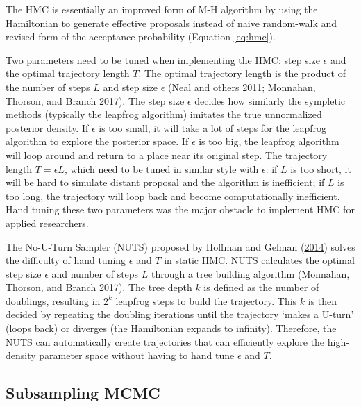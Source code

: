 \documentclass[12pt]{book}
\numberwithin{equation}{chapter}
\begin{document}
The HMC is essentially an improved form of M-H algorithm by using the Hamiltonian to generate effective proposals instead of naive random-walk and revised form of the acceptance probability (Equation \eqref{eq:hmc}).

Two parameters need to be tuned when implementing the HMC: step size \(\epsilon\) and the optimal trajectory length \(T\). The optimal trajectory length is the product of the number of steps \(L\) and step size \(\epsilon\) (Neal and others \protect\hyperlink{ref-neal2011mcmc}{2011}; Monnahan, Thorson, and Branch \protect\hyperlink{ref-monnahan2017faster}{2017}). The step size \(\epsilon\) decides how similarly the sympletic methods (typically the leapfrog algorithm) imitates the true unnormalized posterior density. If \(\epsilon\) is too small, it will take a lot of steps for the leapfrog algorithm to explore the posterior space. If \(\epsilon\) is too big, the leapfrog algorithm will loop around and return to a place near its original step. The trajectory length \(T = \epsilon L\), which need to be tuned in similar style with \(\epsilon\): if \(L\) is too short, it will be hard to simulate distant proposal and the algorithm is inefficient; if \(L\) is too long, the trajectory will loop back and become computationally inefficient. Hand tuning these two parameters was the major obstacle to implement HMC for applied researchers.

The No-U-Turn Sampler (NUTS) proposed by Hoffman and Gelman (\protect\hyperlink{ref-hoffman2014no}{2014}) solves the difficulty of hand tuning \(\epsilon\) and \(T\) in static HMC. NUTS calculates the optimal step size \(\epsilon\) and number of steps \(L\) through a tree building algorithm (Monnahan, Thorson, and Branch \protect\hyperlink{ref-monnahan2017faster}{2017}). The tree depth \(k\) is defined as the number of doublings, resulting in \(2^k\) leapfrog steps to build the trajectory. This \(k\) is then decided by repeating the doubling iterations until the trajectory `makes a U-turn' (loops back) or diverges (the Hamiltonian expands to infinity). Therefore, the NUTS can automatically create trajectories that can efficiently explore the high-density parameter space without having to hand tune \(\epsilon\) and \(T\).

\hypertarget{subsampling-mcmc}{%
\subsection{Subsampling MCMC}\label{subsampling-mcmc}}
\end{document}
